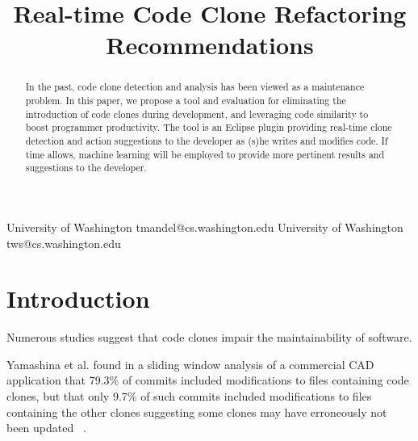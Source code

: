 \documentclass[preprint,10pt]{sigplanconf}
\begin{document}
%

\title{Real-time Code Clone Refactoring Recommendations}
           {University of Washington}
           {tmandel@cs.washington.edu}
           {University of Washington}
           {tws@cs.washington.edu}
\maketitle
\begin{abstract}
In the past, code clone detection and analysis has been viewed as a
maintenance problem. In this paper, we propose a tool and evaluation
for eliminating the introduction of code clones during development,
and leveraging code similarity to boost programmer productivity. The tool
is an Eclipse plugin providing real-time clone detection and action
suggestions to the developer as (s)he writes and modifies
code. If time allows, machine learning will be 
employed to provide more pertinent results
and suggestions to the developer.
\end{abstract}



\section{Introduction}

Numerous studies suggest that code clones impair the maintainability
of software.

Yamashina et al. found in a sliding window analysis of a commercial CAD
application that 79.3\% of commits included modifications to files
containing code clones, but that only 9.7\% of such commits included
modifications to files containing the other
clones suggesting some clones may have erroneously not been updated
~\cite{Yamashina2008}. 
\end{document}
